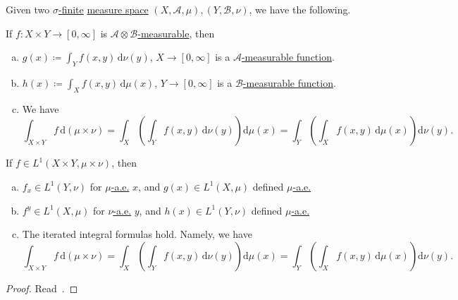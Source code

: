 \begin{theorem}\label{thm:Fubini-Tonelli}
	Given two \hyperref[def:finite-measure]{\(\sigma \)-finite} \hyperref[def:measure-space]{measure space} \((X, \mathcal{A} , \mu ), (Y, \mathcal{B} , \nu )\), we have the following.

	\begin{theorem*}\label{thm:Tonelli}
		If \(f\colon X\times Y\to [0, \infty ]\) is \hyperref[def:A-measurable-function]{\(\mathcal{A} \otimes \mathcal{B} \)-measurable}, then
		\begin{enumerate}[(a)]
			\item \(g(x)\coloneqq \int_Y f(x, y)\,\mathrm{d} \nu (y)\), \(X\to [0, \infty ]\) is a \hyperref[def:A-measurable-function]{\(\mathcal{A}\)-measurable function}.
			\item \(h(x)\coloneqq \int_X f(x, y)\,\mathrm{d} \mu (x)\), \(Y\to [0, \infty ]\) is a \hyperref[def:A-measurable-function]{\(\mathcal{B}\)-measurable function}.
			\item We have
			      \[
				      \int_{X\times Y} f \,\mathrm{d}(\mu \times \nu ) = \int _X\left(\int _Y f(x, y)\,\mathrm{d}\nu (y)\right)\mathrm{d} \mu (x) = \int _Y\left(\int_X f(x, y)\,\mathrm{d} \mu (x)\right)\mathrm{d} \nu (y).
			      \]
		\end{enumerate}
	\end{theorem*}

	\begin{theorem*}\label{thm:Fubini}
		If \(f\in L^1(X\times Y, \mu \times \nu )\), then
		\begin{enumerate}[(a)]
			\item \(f_{x} \in L^1(Y, \nu )\) for \hyperref[def:mu-almost-everywhere]{\(\mu\)-a.e.} \(x\), and \(g(x)\in L^1(X, \mu )\) defined \hyperref[def:mu-almost-everywhere]{\(\mu\)-a.e.}
			\item \(f^{y} \in L^1(X, \mu )\) for \hyperref[def:mu-almost-everywhere]{\(\nu\)-a.e.} \(y\), and \(h(x)\in L^1(Y, \nu )\) defined \hyperref[def:mu-almost-everywhere]{\(\mu\)-a.e.}
			\item The iterated integral formulas hold. Namely, we have
			      \[
				      \int_{X\times Y} f \,\mathrm{d}(\mu \times \nu ) = \int _X\left(\int _Y f(x, y)\,\mathrm{d}\nu (y)\right)\mathrm{d} \mu (x) = \int _Y\left(\int_X f(x, y)\,\mathrm{d} \mu (x)\right)\mathrm{d} \nu (y).
			      \]
		\end{enumerate}
	\end{theorem*}
\end{theorem}
\begin{proof}
	Read~\cite{folland1999real}.
\end{proof}

